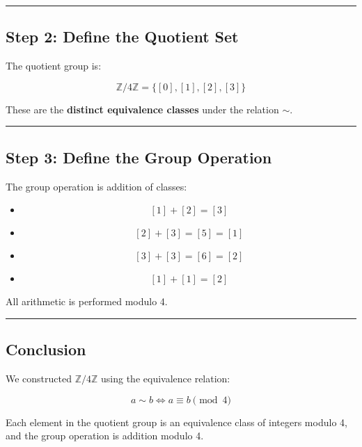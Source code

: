 \documentclass[]{article}
\providecommand{\tightlist}{%
  \setlength{\itemsep}{0pt}\setlength{\parskip}{0pt}}
\begin{document}
\begin{center}\rule{0.5\linewidth}{0.5pt}\end{center}

\subsection{Step 2: Define the Quotient
Set}\label{step-2-define-the-quotient-set}

The quotient group is:

\[
\mathbb{Z}/4\mathbb{Z} = \{ [0], [1], [2], [3] \}
\]

These are the \textbf{distinct equivalence classes} under the relation
\(\sim\).

\begin{center}\rule{0.5\linewidth}{0.5pt}\end{center}

\subsection{Step 3: Define the Group
Operation}\label{step-3-define-the-group-operation}

The group operation is addition of classes:

\begin{itemize}
\tightlist
\item
  \[ [1] + [2] = [3] \]
\item
  \[ [2] + [3] = [5] = [1] \]
\item
  \[ [3] + [3] = [6] = [2] \]
\item
  \[ [1] + [1] = [2] \]
\end{itemize}

All arithmetic is performed modulo 4.

\begin{center}\rule{0.5\linewidth}{0.5pt}\end{center}

\subsection{Conclusion}\label{conclusion}

We constructed \(\mathbb{Z}/4\mathbb{Z}\) using the equivalence
relation:

\[
a \sim b \iff a \equiv b \pmod{4}
\]

Each element in the quotient group is an equivalence class of integers
modulo 4, and the group operation is addition modulo 4.
\end{document}
